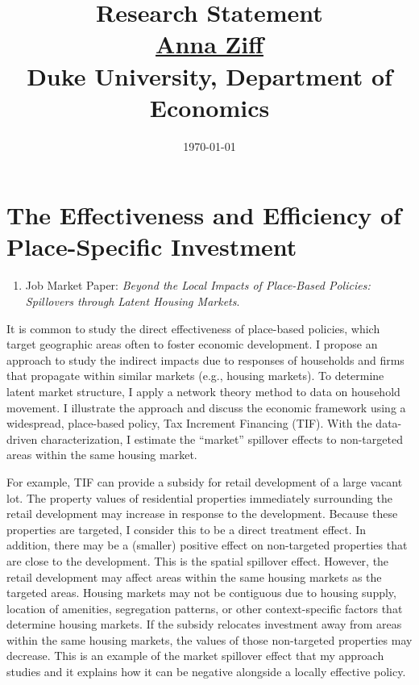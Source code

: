 

\setlength{\parskip}{\baselineskip}%
\setlength{\parindent}{0pt}%
\setlength{\droptitle}{-5em}



\title{\normalsize \textbf{Research Statement} \\ \href{https://aziff.github.io}{Anna Ziff} \\ Duke University, Department of Economics}
\date{\vspace{-2.5cm} \normalsize \today}
\maketitle

\singlespacing
\vspace{-2cm}

\section{The Effectiveness and Efficiency of Place-Specific Investment}


\begin{enumerate}
\item Job Market Paper: \textit{Beyond the Local Impacts of Place-Based Policies: Spillovers through Latent Housing Markets}.
\end{enumerate}

It is common to study the direct effectiveness of place-based policies, which target geographic areas often to foster economic development. I propose an approach to study the indirect impacts due to responses of households and firms that propagate within similar markets (e.g., housing markets). To determine latent market structure, I apply a network theory method to data on household movement. I illustrate the approach and discuss the economic framework using a widespread, place-based policy, Tax Increment Financing (TIF). With the data-driven characterization, I estimate the ``market'' spillover effects to non-targeted areas within the same housing market. 

For example, TIF can provide a subsidy for retail development of a large vacant lot. The property values of residential properties immediately surrounding the retail development may increase in response to the development. Because these properties are targeted, I consider this to be a direct treatment effect. In addition, there may be a (smaller) positive effect on non-targeted properties that are close to the development. This is the spatial spillover effect. However, the retail development may affect areas within the same housing markets as the targeted areas. Housing markets may not be contiguous due to housing supply, location of amenities, segregation patterns, or other context-specific factors that determine housing markets. If the subsidy relocates investment away from areas within the same housing markets, the values of those non-targeted properties may decrease. This is an example of the market spillover effect that my approach studies and it explains how it can be negative alongside a locally effective policy.

